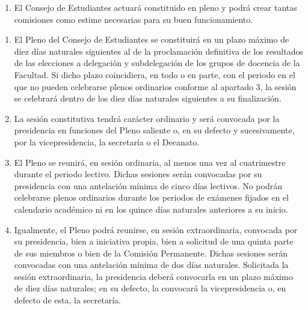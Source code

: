 \documentclass[11pt,a4paper]{article}
\begin{document}
\begin{enumerate}
\begin{enumerate}
    \item Elegir entre sus miembros a sus representantes en el Consejo de Estudiantes de la Universidad de Zaragoza (CEUZ).
    \item Elegir entre sus miembros a sus representantes en asociaciones estudiantiles sectoriales y otros colectivos suprauniversitarios.
    \item Todas aquellas que deriven de la legislación vigente.
  \end{enumerate}
\item El Consejo de Estudiantes actuará constituido en pleno y podrá crear tantas comisiones como estime necesarias para su buen funcionamiento.
\end{enumerate}

\begin{enumerate}
\item El Pleno del Consejo de Estudiantes se constituirá en un plazo máximo de diez días naturales siguientes al de la proclamación definitiva de los resultados de las elecciones a delegación y subdelegación de los grupos de docencia de la Facultad. Si dicho plazo coincidiera, en todo o en parte, con el periodo en el que no pueden celebrarse plenos ordinarios conforme al apartado 3, la sesión se celebrará dentro de los diez días naturales siguientes a su finalización.
\item La sesión constitutiva tendrá carácter ordinario y será convocada por la presidencia en funciones del Pleno saliente o, en su defecto y sucesivamente, por la vicepresidencia, la secretaría o el Decanato.
\item El Pleno se reunirá, en sesión ordinaria, al menos una vez al cuatrimestre durante el periodo lectivo. Dichas sesiones serán convocadas por su presidencia con una antelación mínima de cinco días lectivos. No podrán celebrarse plenos ordinarios durante los periodos de exámenes fijados en el calendario académico ni en los quince días naturales anteriores a su inicio.
\item Igualmente, el Pleno podrá reunirse, en sesión extraordinaria, convocada por su presidencia, bien a iniciativa propia, bien a solicitud de una quinta parte de sus miembros o bien de la Comisión Permanente. Dichas sesiones serán convocadas con una antelación mínima de dos días naturales. Solicitada la sesión extraordinaria, la presidencia deberá convocarla en un plazo máximo de diez días naturales; en su defecto, la convocará la vicepresidencia o, en defecto de esta, la secretaría.

\end{enumerate}
\end{document}
